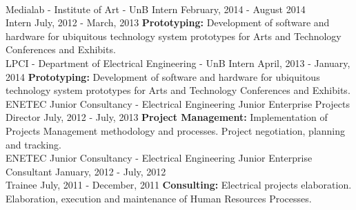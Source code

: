 \documentclass[a4paper]{twentysecondcv} %
\begin{document}
\begin{twenty}
{            \color{pblue}{\hspace{8pt}-\hspace{4pt}} 
        }
        \\
    \twentyitem
    	{Medialab - Institute of Art - UnB}
		{Intern \hfill February, 2014 - August 2014\\}
		{Intern \hfill July, 2012 - March, 2013}
        {
            \color{pblue}{\hspace{8pt}-\hspace{4pt}} \color{black}\textbf{Prototyping: }Development of software and hardware for ubiquitous technology system prototypes for Arts and Technology Conferences and Exhibits.
        }
        \\
    \twentyitem
    {LPCI - Department of Electrical Engineering - UnB}
    {Intern}
    {April, 2013 - January, 2014}
    {
        \color{pblue}{\hspace{8pt}-\hspace{4pt}} \color{black}\textbf{Prototyping: }Development of software and hardware for ubiquitous technology system prototypes for Arts and Technology Conferences and Exhibits.
    }
    \\
    \twentyitem
    {ENETEC Junior Consultancy - Electrical Engineering Junior Enterprise}
    {Projects Director}
    {July, 2012 - July, 2013}
    {\color{pblue}{\hspace{8pt}-\hspace{4pt}} \color{black}\textbf{Project Management: }Implementation of Projects Management methodology and processes. Project negotiation, planning and tracking.}
    \\
    \twentyitem
    {ENETEC Junior Consultancy - Electrical Engineering Junior Enterprise}
    {Consultant \hfill January, 2012 - July, 2012\\}
    {Trainee  \hfill July, 2011 - December, 2011}
    {\color{pblue}{\hspace{8pt}-\hspace{4pt}} \color{black}\textbf{Consulting: }Electrical projects elaboration. Elaboration, execution and maintenance of Human Resources Processes.}
\end{twenty}

\end{document}
